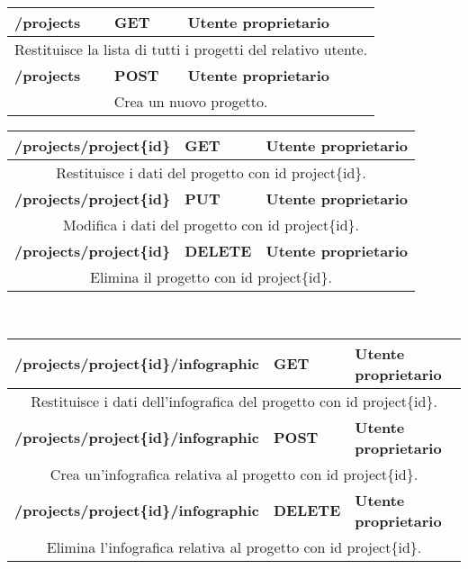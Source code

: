 \begin{table}[h]
			\begin{tabular}{|p{}|p{}|p{}|}
				\toprule
				\textbf{/projects} & \textbf{GET} & \textbf{Utente proprietario} \\ \midrule
				\multicolumn{3}{|c|}{Restituisce la lista di tutti i progetti del relativo utente.} \\
				\bottomrule
				\textbf{/projects} & \textbf{POST} & \textbf{Utente proprietario} \\ \midrule
				\multicolumn{3}{|c|}{Crea un nuovo progetto.} \\
				\bottomrule
			\end{tabular}
		\end{table}
		\newpage
		
		\begin{table}[H]
			\begin{tabular}{|p{}|p{}|p{}|}
				\toprule
				\textbf{/projects/project\{id\}} & \textbf{GET} & \textbf{Utente proprietario} \\ \midrule
				\multicolumn{3}{|c|}{Restituisce i dati del progetto con id project\{id\}.} \\ \midrule
				\textbf{/projects/project\{id\}} & \textbf{PUT} & \textbf{Utente proprietario} \\ \midrule
				\multicolumn{3}{|c|}{Modifica i dati del progetto con id project\{id\}.} \\ \midrule
				\textbf{/projects/project\{id\}} & \textbf{DELETE} & \textbf{Utente proprietario} \\ \midrule
				\multicolumn{3}{|c|}{Elimina il progetto con id project\{id\}.} \\
				\bottomrule
			\end{tabular}
\\ \par\bigskip

			\begin{tabular}{|p{}|p{}|p{}|}
				\toprule
				\textbf{/projects/project\{id\}/infographic} & \textbf{GET} & \textbf{Utente proprietario} \\ \midrule
				\multicolumn{3}{|c|}{Restituisce i dati dell'infografica del progetto con id project\{id\}.} \\
				\bottomrule
				\textbf{/projects/project\{id\}/infographic} & \textbf{POST} & \textbf{Utente proprietario} \\ \midrule
				\multicolumn{3}{|c|}{Crea un'infografica relativa al progetto con id project\{id\}.} \\
				\bottomrule
				\textbf{/projects/project\{id\}/infographic} & \textbf{DELETE} & \textbf{Utente proprietario} \\ \midrule
				\multicolumn{3}{|c|}{Elimina l'infografica relativa al progetto con id project\{id\}.} \\
				\bottomrule
			\end{tabular}\\
			\par\bigskip
			

\end{table}
